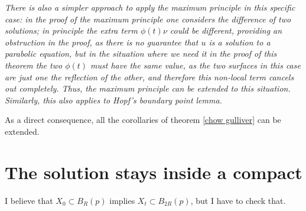 \begin{oss}\em
	There is also a simpler approach to apply the maximum principle in this specific case: in the proof of the maximum principle one considers the difference of two solutions; in principle the extra term $\phi(t) \nu$ could be different, providing an obstruction in the proof, as there is no guarantee that $u$ is a solution to a parabolic equation, but in the situation where we need it in the proof of this theorem the two $\phi(t)$ must have the same value, as the two surfaces in this case are just one the reflection of the other, and therefore this non-local term cancels out completely. Thus, the maximum principle can be extended to this situation. Similarly, this also applies to Hopf's boundary point lemma. 
\end{oss}

As a direct consequence, all the corollaries of theorem \ref{chow gulliver} can be extended. 
\section{The solution stays inside a compact}

I believe that $X_0\subset B_R(p)$ implies  $X_t\subset B_{2R}(p)$, but I have to check that.
